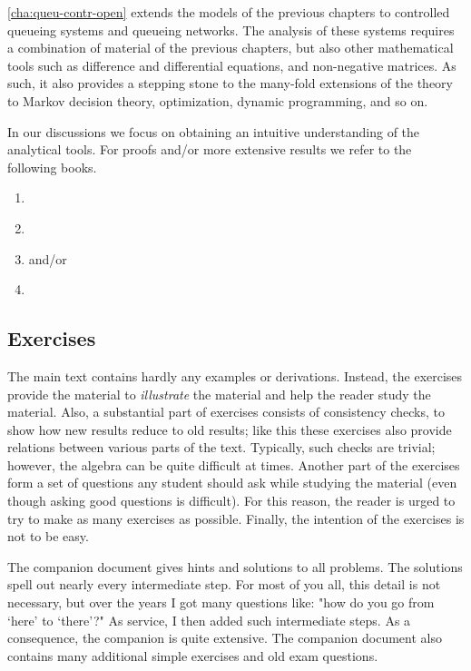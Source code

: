 \documentclass[companion]{subfiles}
\begin{document}
\cref{cha:queu-contr-open} extends the models of the previous chapters to controlled queueing systems and queueing networks.
The analysis of these systems requires a combination of material of the previous chapters, but also other mathematical tools such as difference and differential equations, and non-negative matrices.
As such, it also provides a stepping stone to the many-fold extensions of the theory to Markov decision theory, optimization, dynamic programming, and so on.

In our discussions we focus on obtaining an intuitive understanding of the analytical tools. For proofs and/or more extensive results we refer to the following books.
\begin{enumerate}
\item \citet{bolch06:_queuein_networ_markov_chain}
\item \citet{el-taha98:_sampl_path_analy_queuein_system}
\item \citet{tijms94:_stoch_model_algor_approac} and/or \citet{tijms03:_first_cours_stoch_model}
\item \citet{capinski03:_probab_probl}
\end{enumerate}



\subsection*{Exercises}

The main text contains hardly any examples or derivations.
Instead, the exercises provide the material to \emph{illustrate} the material and help the reader study the material.
Also, a substantial part of exercises consists of consistency checks, to show how new results reduce to old results; like this these exercises also provide relations between various parts of the text.
Typically, such checks are trivial; however, the algebra can be quite difficult at times.
Another part of the exercises form a set of questions any student should ask while studying the material (even though asking good questions is difficult).
For this reason, the reader is urged to try to make as many exercises as possible.
Finally, the intention of the exercises is not to be easy.

The companion document gives hints and solutions to all problems.
The solutions spell out nearly every intermediate step.
For most of you all, this detail is not necessary, but over the years I got many questions like: "how do you go from `here' to `there'?"
As service, I then added such intermediate steps.
As a consequence, the companion is quite extensive.
The companion document also contains many additional simple exercises and old exam questions.
\end{document}
